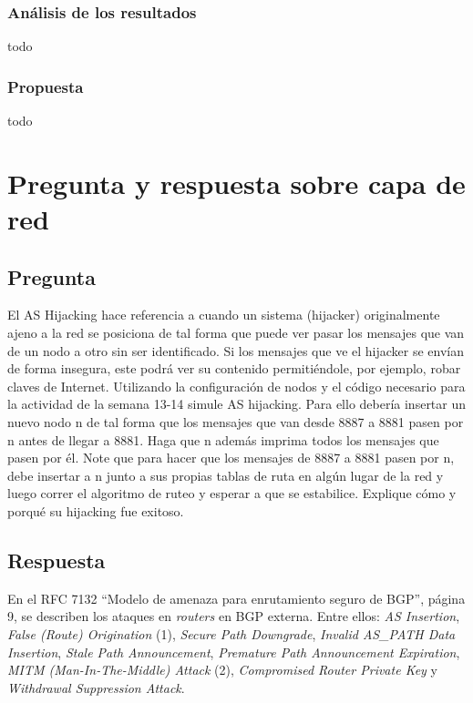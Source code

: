 \documentclass{article}
\begin{document}
\subsubsection{Análisis de los resultados}
todo
\subsubsection{Propuesta}
todo
\section{Pregunta y respuesta sobre \textbf{capa de red}}
\subsection{Pregunta}
El AS Hijacking hace referencia a cuando un sistema (hijacker) originalmente ajeno a la red se posiciona de tal forma que puede ver pasar los mensajes que van de un nodo a otro sin ser identificado. Si los mensajes que ve el hijacker se envían de forma insegura, este podrá ver su contenido permitiéndole, por ejemplo, robar claves de Internet. Utilizando la configuración de nodos y el código necesario para la actividad de la semana 13-14 simule AS hijacking. Para ello debería insertar un nuevo nodo n de tal forma que los mensajes que van desde 8887 a 8881 pasen por n antes de llegar a 8881. Haga que n además imprima todos los mensajes que pasen por él. Note que para hacer que los mensajes de 8887 a 8881 pasen por n, debe insertar a n junto a sus propias tablas de ruta en algún lugar de la red y luego correr el algoritmo de ruteo y esperar a que se estabilice. Explique cómo y porqué su hijacking fue exitoso.
\subsection{Respuesta}
En el RFC 7132 ``Modelo de amenaza para enrutamiento seguro de BGP''\cite{rfc7132}, página 9, se describen los ataques en \textit{routers} en BGP externa. Entre ellos: \textit{AS Insertion}, \textit{False (Route) Origination} (1), \textit{Secure Path Downgrade}, \textit{Invalid AS\_PATH Data Insertion}, \textit{Stale Path Announcement}, \textit{Premature Path Announcement Expiration}, \textit{MITM (Man-In-The-Middle) Attack} (2), \textit{Compromised Router Private Key} y \textit{Withdrawal Suppression Attack}.
\end{document}
